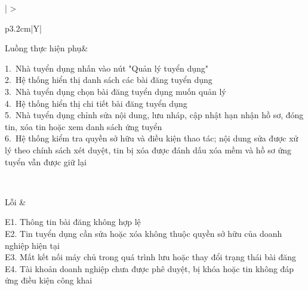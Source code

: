 \begin{table}[H]
\begin{tabularx}{\textwidth}{|
        >{\bfseries\raggedright\arraybackslash}p{3.2cm}|Y|}
        Luồng thực hiện phụ&
        \parbox[t]{\hsize}{
            1.\ Nhà tuyển dụng nhấn vào nút "Quản lý tuyển dụng"\\
            2.\ Hệ thống hiển thị danh sách các bài đăng tuyển dụng\\
            3.\ Nhà tuyển dụng chọn bài đăng tuyển dụng muốn quản lý\\
            4.\ Hệ thống hiển thị chi tiết bài đăng tuyển dụng\\
            5.\ Nhà tuyển dụng chỉnh sửa nội dung, lưu nháp, cập nhật hạn nhận hồ sơ, đóng tin, xóa tin hoặc xem danh sách ứng tuyển\\
            6.\ Hệ thống kiểm tra quyền sở hữu và điều kiện thao tác; nội dung sửa được xử lý theo chính sách xét duyệt, tin bị xóa được đánh dấu xóa mềm và hồ sơ ứng tuyển vẫn được giữ lại
        }\\
        \hline
        

        Lỗi &
        \parbox[t]{\hsize}{
            E1. Thông tin bài đăng không hợp lệ\\
            E2. Tin tuyển dụng cần sửa hoặc xóa không thuộc quyền sở hữu của doanh nghiệp hiện tại\\
            E3. Mất kết nối máy chủ trong quá trình lưu hoặc thay đổi trạng thái bài đăng\\
            E4. Tài khoản doanh nghiệp chưa được phê duyệt, bị khóa hoặc tin không đáp ứng điều kiện công khai
        }\\
        \hline
    \end{tabularx}

    \caption{Use case CV-4.1: Quản lý bài đăng tuyển dụng}
    \label{tab:usecase-cv41}
\end{table}

